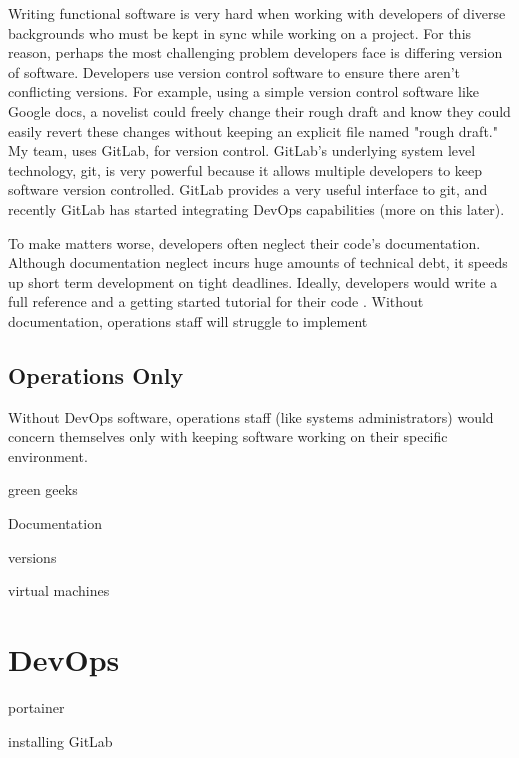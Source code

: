 \documentclass[titlepage]{article}
\begin{document}
Writing functional software is very hard when working with developers of diverse backgrounds who must be kept in sync while working on a project. For this reason, perhaps the most challenging problem developers face is differing version of software. Developers use version control software to ensure there aren’t conflicting versions. For example, using a simple version control software like Google docs, a novelist could freely change their rough draft and know they could easily revert these changes without keeping an explicit file named "rough draft." My team, uses GitLab, for version control. GitLab's underlying system level technology, git, is very powerful because it allows multiple developers to keep software version controlled. GitLab provides a very useful interface to git, and recently GitLab has started integrating DevOps capabilities (more on this later).

To make matters worse, developers often neglect their code's documentation. Although documentation neglect incurs huge amounts of technical debt, it speeds up short term development on tight deadlines. Ideally, developers would write a full reference and a getting started tutorial for their code \cite{Dagenais:2010:CED:1882291.1882312}. Without documentation, operations staff will struggle to implement 



\subsection{Operations Only}

Without DevOps software, operations staff (like systems administrators) would concern themselves only with keeping software working on their specific environment. 

green geeks

Documentation

versions

virtual machines

\section{DevOps}

portainer

installing GitLab







\setlength{\bibleftmargin}{.125in}
\doublespacing


\nocite{*}
\end{document}
